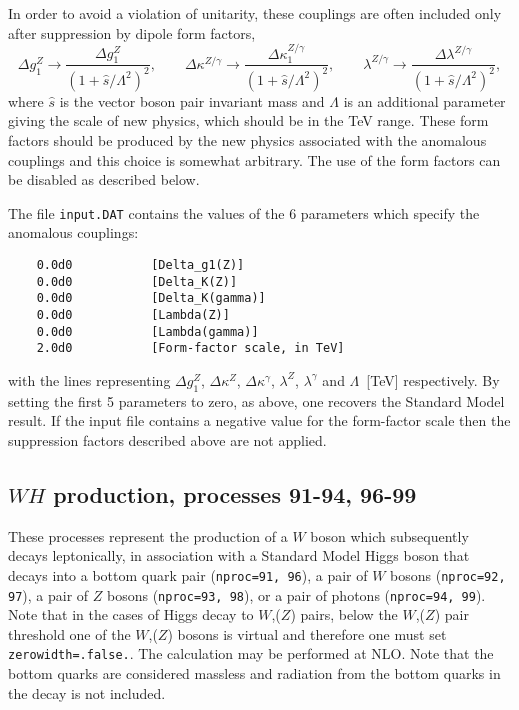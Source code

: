 \documentclass[12pt]{article}
\begin{document}
In order to avoid a violation of unitarity, these couplings are often
included only after suppression by dipole form factors,
\begin{displaymath}
\Delta g_1^Z \rightarrow \frac{\Delta g_1^Z}{(1+\hat{s}/\Lambda^2)^2}, \qquad
\Delta \kappa^{Z/\gamma} \rightarrow
 \frac{\Delta \kappa_1^{Z/\gamma}}{(1+\hat{s}/\Lambda^2)^2}, \qquad
\lambda^{Z/\gamma} \rightarrow
 \frac{\Delta \lambda^{Z/\gamma}}{(1+\hat{s}/\Lambda^2)^2},
\end{displaymath}
where $\hat{s}$ is the vector boson pair invariant mass and $\Lambda$
is an additional parameter giving the scale of new physics, which should
be in the TeV range.
These form factors should be produced by the new physics associated with the
anomalous couplings and this choice is somewhat arbitrary. The use of the form
factors can be disabled as described below.

The file {\tt input.DAT} contains the values of the $6$ parameters
which specify the anomalous couplings:
\begin{verbatim}
    0.0d0           [Delta_g1(Z)]
    0.0d0           [Delta_K(Z)]
    0.0d0           [Delta_K(gamma)]
    0.0d0           [Lambda(Z)]
    0.0d0           [Lambda(gamma)]
    2.0d0           [Form-factor scale, in TeV]
\end{verbatim}
with the lines representing $\Delta g_1^Z$, $\Delta \kappa^Z$,
$\Delta \kappa^\gamma$, $\lambda^Z$, $\lambda^\gamma$ and
$\Lambda$~[TeV] respectively. By setting the first 5 parameters to zero,
as above, one recovers the Standard Model result.
If the input file contains a negative value for the form-factor scale
then the suppression factors described above are not applied.

\subsection{$WH$ production, processes 91-94, 96-99}
\label{subsec:wh}

These processes represent the production of a $W$ boson which subsequently
decays leptonically, in association with a Standard Model Higgs boson that
decays into a bottom quark pair ({\tt nproc=91, 96}), 
a pair of $W$ bosons ({\tt nproc=92, 97}), 
a pair of $Z$ bosons ({\tt nproc=93, 98}), or a pair of photons ({\tt nproc=94, 99}).  
Note that in the cases of Higgs decay to $W$,($Z$) pairs, 
below the $W$,($Z$) pair threshold
one of the $W$,($Z$) bosons is virtual 
and therefore one must set {\tt zerowidth=.false.}.
The calculation may be performed at NLO.
Note that the bottom quarks are considered massless and radiation from the
bottom quarks in the decay is not included.
\end{document}
